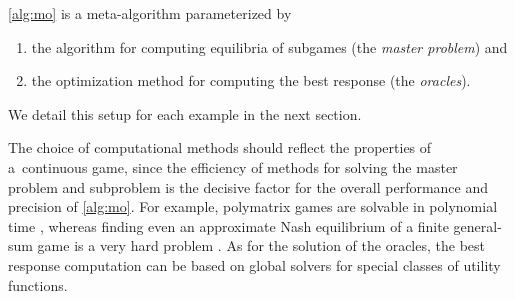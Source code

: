 \cref{alg:mo} is a meta-algorithm parameterized by
\begin{enumerate}
	\item the algorithm for computing equilibria of subgames (the \emph{master problem}) and
	\item the optimization method for computing the best response (the \emph{oracles}).
\end{enumerate}
We detail this setup for each example in the next section.

The choice of computational methods should reflect the properties of a~continuous game, since the efficiency of methods for solving the master problem and subproblem is the decisive factor for the overall performance and precision of \cref{alg:mo}. For example, polymatrix games are solvable in polynomial time \cite{Cai16}, whereas finding even an approximate Nash equilibrium of a finite general-sum game is a very hard problem \cite{Daskalakis09}. As for the solution of the oracles, the best response computation can be based on global solvers for special classes of utility functions.
